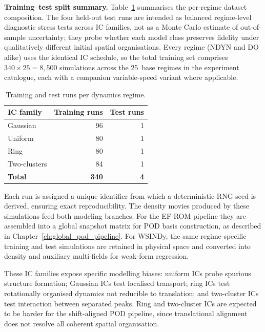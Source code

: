 \noindent\textbf{Training--test split summary.}
\label{subsec:train_test_split}
Table~\ref{tab:ic_split} summarises the per-regime dataset composition.
The four held-out test runs are intended as balanced regime-level diagnostic
stress tests across IC families, not as a Monte Carlo estimate of
out-of-sample uncertainty; they probe whether each model class preserves
fidelity under qualitatively different initial spatial organisations.
Every
regime (NDYN and DO alike) uses the identical IC schedule, so the total
training set comprises $340 \times 25 = 8{,}500$ simulations across the
25~base regimes in the experiment catalogue, each with a companion variable-speed variant where applicable.

\begin{table}[htbp]
\centering
\caption{Training and test runs per dynamics regime.}
\label{tab:ic_split}
\begin{tabular}{lrr}
\hline
IC family & Training runs & Test runs \\
\hline
Gaussian     & 96 & 1 \\
Uniform      & 80 & 1 \\
Ring         & 80 & 1 \\
Two-clusters & 84 & 1 \\
\hline
\textbf{Total} & \textbf{340} & \textbf{4} \\
\hline
\end{tabular}
\end{table}

Each run is assigned a unique identifier from which a deterministic RNG seed
is derived, ensuring exact reproducibility.  The density movies produced by
these simulations feed both modeling branches.  For the EF-ROM pipeline they
are assembled into a global snapshot matrix for POD basis construction, as
described in Chapter~\ref{ch:global_pod_pipeline}.  For WSINDy, the same
regime-specific training and test simulations are retained in physical space
and converted into density and auxiliary multi-fields for weak-form regression.

These IC families expose specific modelling biases:
uniform ICs probe spurious structure formation; Gaussian ICs test localised
transport; ring ICs test rotationally organised dynamics not reducible to
translation; and two-cluster ICs test interaction between separated peaks.
Ring and two-cluster ICs are expected to be harder for the shift-aligned
POD pipeline, since translational alignment does not resolve all coherent
spatial organisation.

